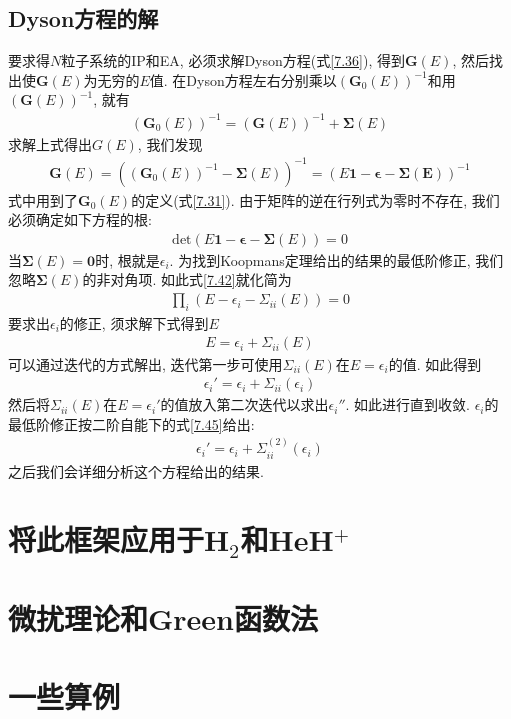 \subsection{Dyson方程的解}
要求得$N$粒子系统的IP和EA, 必须求解Dyson方程(式\eqref{7.36}), 得到$\mathbf{G}(E)$, 然后找出使$\mathbf{G}(E)$为无穷的$E$值. 在Dyson方程左右分别乘以$(\mathbf{G}_0(E))^{-1}$和用$(\mathbf{G}(E))^{-1}$, 就有
\begin{align}
(\mathbf{G}_0(E))^{-1} = (\mathbf{G}(E))^{-1} + \bm{\Sigma}(E)
\end{align}
求解上式得出$G(E)$, 我们发现
\begin{align}
\mathbf{G}(E) = ((\mathbf{G}_0(E))^{-1} - \bm{\Sigma}(E))^{-1} = (E\mathbf{1} - \bm{\epsilon} - \bm{\Sigma(E)})^{-1}
\end{align}
式中用到了$\mathbf{G}_0(E)$的定义(式\eqref{7.31}). 由于矩阵的逆在行列式为零时不存在, 我们必须确定如下方程的根:
\begin{align}
\mathrm{det}(E\mathbf{1} - \bm{\epsilon} - \bm{\Sigma}(E)) = 0
\end{align}
当$\bm{\Sigma}(E)=\mathbf{0}$时, 根就是$\epsilon_i$. 为找到Koopmans定理给出的结果的最低阶修正, 我们忽略$\bm{\Sigma}(E)$的非对角项. 如此式\eqref{7.42}就化简为
\begin{align}
\prod_i (E-\epsilon_i - \Sigma_{ii}(E)) = 0
\end{align}
要求出$\epsilon_i$的修正, 须求解下式得到$E$
\begin{align}
E=\epsilon_i+\Sigma_{ii}(E)
\end{align}
可以通过迭代的方式解出, 迭代第一步可使用$\Sigma_{ii}(E)$在$E=\epsilon_i$的值. 如此得到
\begin{align}
\epsilon_i' = \epsilon_i + \Sigma_{ii}(\epsilon_i)
\end{align}
然后将$\Sigma_{ii}(E)$在$E=\epsilon_i'$的值放入第二次迭代以求出$\epsilon_i''$. 如此进行直到收敛. $\epsilon_i$的最低阶修正按二阶自能下的式\eqref{7.45}给出:
\begin{align}
\epsilon_i' = \epsilon_i + \Sigma_{ii}^{(2)}(\epsilon_i)
\end{align}
之后我们会详细分析这个方程给出的结果.
\section{将此框架应用于H$_2$和HeH$^+$}
\section{微扰理论和Green函数法}
\section{一些算例}
\theendnotes
